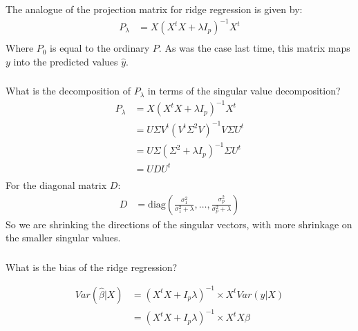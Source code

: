 \begin{frame}[fragile] \frametitle{}

The analogue of the projection matrix for ridge regression
is given by:
\begin{align*}
P_{\lambda} &= X (X^t X + \lambda I_p)^{-1} X^t \\
\end{align*}
Where $P_{0}$ is equal to the ordinary $P$. \pause As was
the case last time, this matrix maps $y$ into the predicted
values $\hat{y}$.

\end{frame}

\begin{frame}[fragile] \frametitle{}

What is the decomposition of $P_\lambda$ in terms of the singular
value decomposition?
\begin{align*}
P_\lambda &= X (X^t X + \lambda I_p)^{-1} X^t \\
&= U \Sigma V^t (V^t \Sigma^2 V)^{-1} V \Sigma U^t \\
&= U \Sigma (\Sigma^{2} + \lambda I_p)^{-1} \Sigma U^t \\
&= U D U^t \\
\end{align*}
For the diagonal matrix $D$:
\begin{align}
D &= \text{diag} \left( \frac{\sigma_1^2}{\sigma_1^2 + \lambda}, \ldots, \frac{\sigma_p^2}{\sigma_p^2 + \lambda}  \right)
\end{align}
\pause So we are shrinking the directions of the singular vectors, with
more shrinkage on the smaller singular values.

\end{frame}


\begin{frame}[fragile] \frametitle{}

What is the bias of the ridge regression?

\begin{align*}
Var \left(\widehat{\beta} | X \right) &= (X^t X + I_p \lambda)^{-1} \times X^t Var(y | X) \\
&= (X^t X + I_p \lambda)^{-1} \times X^t X \beta
\end{align*}

\end{frame}

